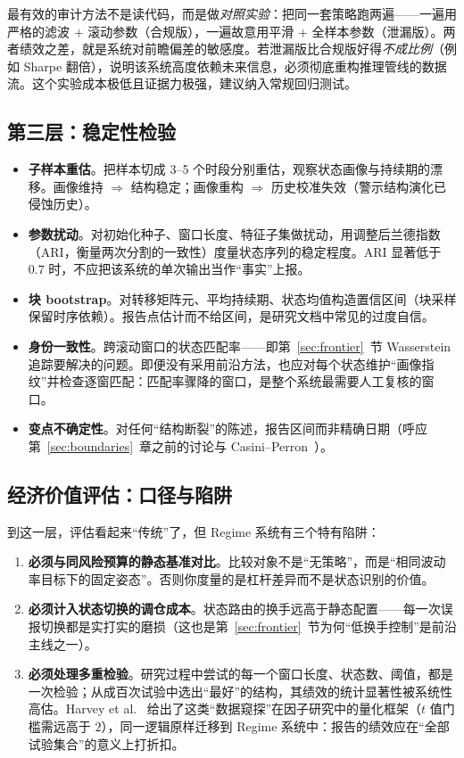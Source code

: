 \begin{remark}
最有效的审计方法不是读代码，而是做\emph{对照实验}：把同一套策略跑两遍——一遍用严格的滤波 $+$ 滚动参数（合规版），一遍故意用平滑 $+$ 全样本参数（泄漏版）。两者绩效之差，就是系统对前瞻偏差的敏感度。若泄漏版比合规版好得\emph{不成比例}（例如 Sharpe 翻倍），说明该系统高度依赖未来信息，必须彻底重构推理管线的数据流。这个实验成本极低且证据力极强，建议纳入常规回归测试。
\end{remark}

\subsection{第三层：稳定性检验}

\begin{itemize}[itemsep=3pt]
\item \textbf{子样本重估}。把样本切成 3--5 个时段分别重估，观察状态画像与持续期的漂移。画像维持 $\Rightarrow$ 结构稳定；画像重构 $\Rightarrow$ 历史校准失效（警示结构演化已侵蚀历史）。
\item \textbf{参数扰动}。对初始化种子、窗口长度、特征子集做扰动，用调整后兰德指数（ARI，衡量两次分割的一致性）度量状态序列的稳定程度。ARI 显著低于 $0.7$ 时，不应把该系统的单次输出当作“事实”上报。
\item \textbf{块 bootstrap}。对转移矩阵元、平均持续期、状态均值构造置信区间（块采样保留时序依赖）。报告点估计而不给区间，是研究文档中常见的过度自信。
\item \textbf{身份一致性}。跨滚动窗口的状态匹配率——即第~\ref{sec:frontier}~节 Wasserstein 追踪要解决的问题。即便没有采用前沿方法，也应对每个状态维护“画像指纹”并检查逐窗匹配：匹配率骤降的窗口，是整个系统最需要人工复核的窗口。
\item \textbf{变点不确定性}。对任何“结构断裂”的陈述，报告区间而非精确日期（呼应第~\ref{sec:boundaries}~章之前的讨论与 Casini--Perron~\cite{casini2022}）。
\end{itemize}

\subsection{经济价值评估：口径与陷阱}

到这一层，评估看起来“传统”了，但 Regime 系统有三个特有陷阱：

\begin{enumerate}[itemsep=3pt]
\item \textbf{必须与同风险预算的静态基准对比}。比较对象不是“无策略”，而是“相同波动率目标下的固定姿态”。否则你度量的是杠杆差异而不是状态识别的价值。
\item \textbf{必须计入状态切换的调仓成本}。状态路由的换手远高于静态配置——每一次误报切换都是实打实的磨损（这也是第~\ref{sec:frontier}~节为何“低换手控制”是前沿主线之一）。
\item \textbf{必须处理多重检验}。研究过程中尝试的每一个窗口长度、状态数、阈值，都是一次检验；从成百次试验中选出“最好”的结构，其绩效的统计显著性被系统性高估。Harvey et al.~\cite{harvey2016} 给出了这类“数据窥探”在因子研究中的量化框架（$t$ 值门槛需远高于 $2$），同一逻辑原样迁移到 Regime 系统中：报告的绩效应在“全部试验集合”的意义上打折扣。
\end{enumerate}

